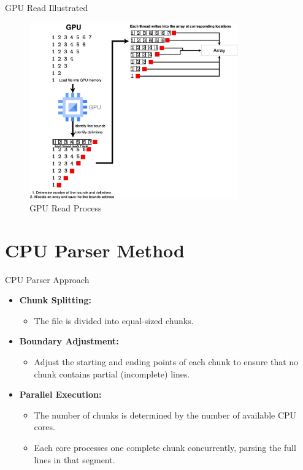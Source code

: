 \documentclass{beamer}
\begin{document}
\begin{frame}{GPU Read Illustrated}
  \begin{figure}
    \centering
    \includegraphics[width=0.8\textwidth]{2.png}
    \caption{GPU Read Process}
    \label{fig:gpu_read}
  \end{figure}
\end{frame}


\section{CPU Parser Method}
\begin{frame}{CPU Parser Approach}
  \begin{itemize}
    \item \textbf{Chunk Splitting:}
      \begin{itemize}
        \item The file is divided into equal-sized chunks.
      \end{itemize}
    \item \textbf{Boundary Adjustment:}
      \begin{itemize}
        \item Adjust the starting and ending points of each chunk to ensure that no chunk contains partial (incomplete) lines.
      \end{itemize}
    \item \textbf{Parallel Execution:}
      \begin{itemize}
        \item The number of chunks is determined by the number of available CPU cores.
        \item Each core processes one complete chunk concurrently, parsing the full lines in that segment.
      \end{itemize}
  \end{itemize}
\end{frame}
\end{document}
